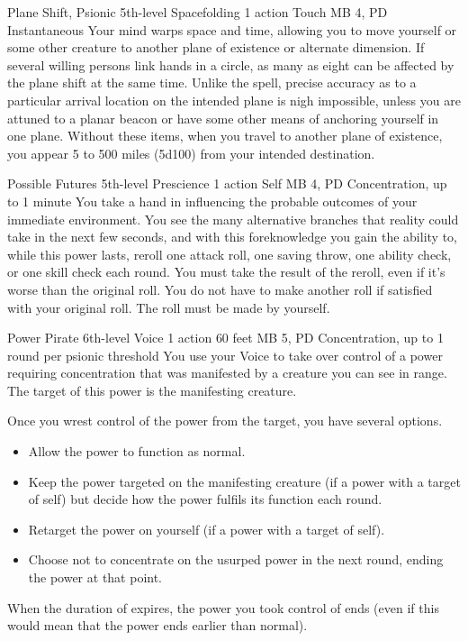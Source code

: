 \DndPowerHeader%
  {Plane Shift, Psionic}
  {5th-level Spacefolding}
  {1 action}
  {Touch}
  {MB 4, PD \lvlfive}
  {Instantaneous}
Your mind warps space and time,
allowing you to move yourself
or some other creature to another plane of existence
or alternate dimension.
If several willing persons link hands in a circle,
as many as eight can be affected by the plane shift at the same time.
Unlike the  spell,
precise accuracy as to a particular arrival location
on the intended plane is nigh impossible,
unless you are attuned to a planar beacon
or have some other means of anchoring yourself in one plane.
Without these items,
when you travel to another plane of existence,
you appear 5 to 500 miles (5d100) from your intended destination.

\DndPowerHeader%
  {Possible Futures}
  {5th-level Prescience}
  {1 action}
  {Self}
  {MB 4, PD \lvlfive}
  {Concentration, up to 1 minute}
You take a hand in influencing the probable outcomes
of your immediate environment.
You see the many alternative branches that reality could take
in the next few seconds,
and with this foreknowledge you gain the ability to,
while this power lasts,
reroll one attack roll,
one saving throw,
one ability check,
or one skill check each round.
You must take the result of the reroll,
even if it's worse than the original roll.
You do not have to make another roll
if satisfied with your original roll.
The roll must be made by yourself.

\DndPowerHeader%
  {Power Pirate}
  {6th-level Voice}
  {1 action}
  {60 feet}
  {MB 5, PD \lvlsix}
  {Concentration, up to 1 round per psionic threshold}
You use your Voice to take over control of a power
requiring concentration that was manifested
by a creature you can see in range.
The target of this power is the manifesting creature.

Once you wrest control of the power from the target,
you have several options.
\begin{itemize}
  \item Allow the power to function as normal.
  \item Keep the power targeted on the manifesting creature
        (if a power with a target of self) but decide how the power
        fulfils its function each round.
  \item Retarget the power on yourself (if a power with a target of self).
  \item Choose not to concentrate on the usurped power
          in the next round, ending the power at that point.
\end{itemize}
When the duration of  expires,
the power you took control of ends
(even if this would mean that the power ends earlier than normal).

